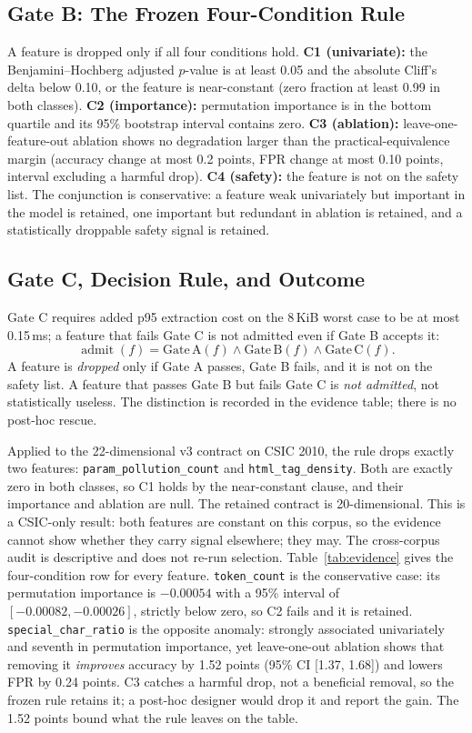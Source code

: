 \documentclass[conference]{IEEEtran}
\newcommand{\feat}[1]{\texttt{#1}}
\begin{document}
\subsection{Gate B: The Frozen Four-Condition Rule}
A feature is dropped only if all four conditions hold. \textbf{C1 (univariate):} the Benjamini--Hochberg adjusted $p$-value is at least 0.05 and the absolute Cliff's delta below 0.10, or the feature is near-constant (zero fraction at least 0.99 in both classes). \textbf{C2 (importance):} permutation importance is in the bottom quartile and its 95\% bootstrap interval contains zero. \textbf{C3 (ablation):} leave-one-feature-out ablation shows no degradation larger than the practical-equivalence margin (accuracy change at most 0.2 points, FPR change at most 0.10 points, interval excluding a harmful drop). \textbf{C4 (safety):} the feature is not on the safety list. The conjunction is conservative: a feature weak univariately but important in the model is retained, one important but redundant in ablation is retained, and a statistically droppable safety signal is retained.

\subsection{Gate C, Decision Rule, and Outcome}
Gate C requires added p95 extraction cost on the 8\,KiB worst case to be at most 0.15\,ms; a feature that fails Gate C is not admitted even if Gate B accepts it:
\begin{equation}
\operatorname{admit}(f)=\mathrm{Gate\,A}(f)\land\mathrm{Gate\,B}(f)\land\mathrm{Gate\,C}(f).
\end{equation}
A feature is \emph{dropped} only if Gate A passes, Gate B fails, and it is not on the safety list. A feature that passes Gate B but fails Gate C is \emph{not admitted}, not statistically useless. The distinction is recorded in the evidence table; there is no post-hoc rescue.

Applied to the 22-dimensional v3 contract on CSIC 2010, the rule drops exactly two features: \feat{param\_pollution\_count} and \feat{html\_tag\_density}. Both are exactly zero in both classes, so C1 holds by the near-constant clause, and their importance and ablation are null. The retained contract is 20-dimensional. This is a CSIC-only result: both features are constant on this corpus, so the evidence cannot show whether they carry signal elsewhere; they may. The cross-corpus audit is descriptive and does not re-run selection. Table~\ref{tab:evidence} gives the four-condition row for every feature. \feat{token\_count} is the conservative case: its permutation importance is $-0.00054$ with a 95\% interval of $[-0.00082,-0.00026]$, strictly below zero, so C2 fails and it is retained. \feat{special\_char\_ratio} is the opposite anomaly: strongly associated univariately and seventh in permutation importance, yet leave-one-out ablation shows that removing it \emph{improves} accuracy by 1.52 points (95\% CI [1.37, 1.68]) and lowers FPR by 0.24 points. C3 catches a harmful drop, not a beneficial removal, so the frozen rule retains it; a post-hoc designer would drop it and report the gain. The 1.52 points bound what the rule leaves on the table.
\end{document}
